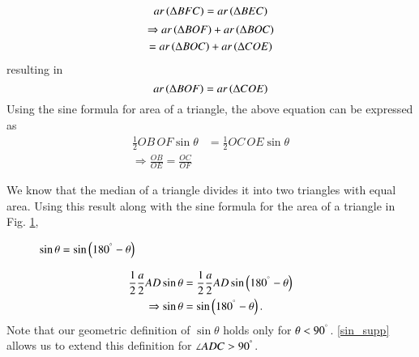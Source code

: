 \begin{equation}
ar \left(\Delta BFC\right) = ar \left(\Delta BEC\right)
\end{equation}
%
\begin{multline}
\Rightarrow ar \left(\Delta BOF\right) + ar \left(\Delta BOC\right) \\
= ar \left(\Delta BOC\right) + ar \left(\Delta COE\right) 
\end{multline}
resulting in
%
\begin{equation}
ar \left(\Delta BOF\right) 
=  ar \left(\Delta COE\right) 
\end{equation}
%
Using the sine formula for area of a triangle, the above equation can be expressed as
%
\begin{align}
\frac{1}{2}OB\,OF \sin \theta &= \frac{1}{2}OC\,OE \sin \theta \\
\Rightarrow 	\frac{OB}{OE} = \frac{OC}{OF} 
\end{align}

\begin{definition}
	We know that the median of a triangle  divides it into two triangles with equal area. Using this result along with the sine formula for the area of a triangle in Fig. \ref{ch2_supp_sin},
\begin{figure}[!ht]
	\begin{center}
		
		\resizebox{\columnwidth}{!}{}
	\end{center}
	\caption{$\sin \theta = \sin \left(180^{\degree}-\theta\right)$}
	\label{ch2_supp_sin}	
\end{figure}

\begin{align}
\frac{1}{2}\frac{a}{2}AD \sin \theta &= \frac{1}{2}\frac{a}{2}AD \sin \left(180^{\degree}-\theta\right) \\
\Rightarrow \sin \theta &= \sin \left(180^{\degree} - \theta\right).
\label{sin_supp}
\end{align}
Note that our geometric definition of $\sin \theta$ holds only for $\theta < 90^{\degree}$.  \eqref{sin_supp} allows us to extend this definition for $\angle ADC > 90^{\degree}$.
\end{definition}

